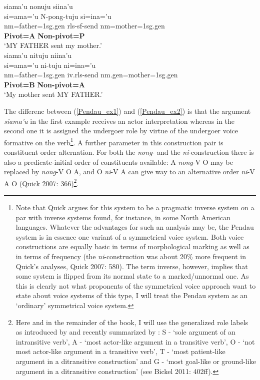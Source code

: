 \pex 
\a \label{Pendau_ex1}
\gllll siama'u nonuju siina'u \\
si=ama='u N-pong-tuju si=ina='u \\
 \acs{nm}=father=\acs{1}\acs{sg}.\acs{gen} \acs{rls}-\acs{sf}-send \acs{nm}=mother=\acs{1}\acs{sg}.\acs{gen} \\
 \textbf{Pivot=A} {} \textbf{Non-pivot=P} \\
\glft `MY FATHER sent my mother.' \\ 
\z
\a \label{Pendau_ex2}
\gllll siama'u nituju niina'u \\
si=ama='u ni-tuju ni=ina='u \\
 \acs{nm}=father=\acs{1}\acs{sg}.\acs{gen} \acs{iv}.\acs{rls}-send \acs{nm}.\acs{gen}=mother=\acs{1}\acs{sg}.\acs{gen} \\
 \textbf{Pivot=B} {} \textbf{Non-pivot=A} \\
\glft `My mother sent MY FATHER.' \\ 
\z
\xe

The differenc between (\ref{Pendau_ex1}) and (\ref{Pendau_ex2}) is that the argument \textit{siama'u} in the first example receives an actor interpretation whereas in the second one it is assigned the undergoer role by virtue of the undergoer voice formative on the verb\footnote{Note that Quick argues for this system to be a pragmatic inverse system on a par with inverse systems found, for instance, in some North American languages. Whatever the advantages for such an analysis may be, the Pendau system is in essence one variant of a symmetrical voice system. Both voice constructions are equally basic in terms of morphological marking as well as in terms of frequency (the \textit{ni}-construction was about 20\% more frequent in Quick's analyses, Quick 2007: 580). The term inverse, however, implies that some system is flipped from its normal state to a marked/unnormal one. As this is clearly not what proponents of the symmetrical voice approach want to state about voice systems of this type, I will treat the Pendau system as an `ordinary' symmetrical voice system.}. A further parameter in this construction pair is constituent order alternation. For both the \textit{nong}- and the \textit{ni}-construction there is also a predicate-initial order of constituents available: A \textit{nong}-V O may be replaced by \textit{nong}-V O A, and O \textit{ni}-V A can give way to an alternative order \textit{ni}-V A O (Quick 2007: 366)\footnote{Here and in the remainder of the book, I will use the generalized role labels as introduced by \textcite{Dixon1979} and recently summarized by \textcite{Bickel2011}: S - `sole argument of an intransitive verb', A - `most actor-like argument in a transitive verb', O - `not most actor-like argument in a transitive verb', T - `most patient-like argument in a ditransitive construction' and G - `most goal-like or ground-like argument in a ditransitive construction' (see Bickel 2011: 402ff).}.

